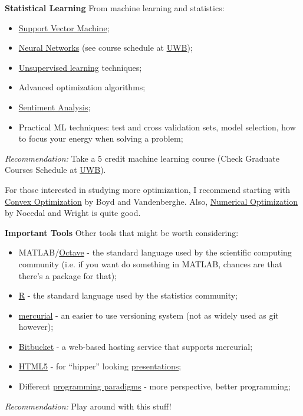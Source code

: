 \documentclass[xcolor=dvipsnames]{beamer}
\begin{document}
\begin{frame}
{\bf Statistical Learning}
From machine learning and statistics: \pause
\begin{itemize}
\item \href{https://en.wikipedia.org/wiki/Support_vector_machine}{Support Vector Machine};\pause
\item \href{https://en.wikipedia.org/wiki/Neural_network}{Neural Networks} (see course schedule at \href{http://www.washington.edu/students/crscatb/css.html\#css485}{UWB});\pause
\item \href{https://en.wikipedia.org/wiki/Unsupervised_learning}{Unsupervised learning} techniques;\pause
\item Advanced optimization algorithms;\pause
\item \href{https://en.wikipedia.org/wiki/Sentiment_analysis}{Sentiment Analysis};\pause
\item Practical ML techniques: test and cross validation sets, model selection, how to focus your energy when solving a problem;
\end{itemize}

\emph{Recommendation: }Take a 5 credit machine learning course (Check Graduate Courses Schedule at \href{http://www.washington.edu/students/crscatb/css.html\#css581}{UWB}). \pause \vfill

For those interested in studying more optimization, I recommend starting with \href{http://www.stanford.edu/~boyd/cvxbook/}{Convex Optimization} by Boyd and Vandenberghe. Also, \href{http://www.ece.northwestern.edu/~nocedal/book/num-opt.html}{Numerical Optimization} by Nocedal and Wright is quite good.
\end{frame}

\begin{frame}
{\bf Important Tools}
Other tools that might be worth considering: \pause
\begin{itemize}
\item MATLAB/\href{https://gnu.org/software/octave/}{Octave} - the standard language used by the scientific computing community (i.e. if you want do something in MATLAB, chances are that there's a package for that);\pause
\item \href{http://www.r-project.org/}{R} - the standard language used by the statistics community;\pause
\item \href{http://mercurial.selenic.com/}{mercurial} - an easier to use versioning system (not as widely used as git however);\pause
\item \href{https://bitbucket.org/}{Bitbucket} - a web-based hosting service that supports mercurial;\pause
\item \href{http://www.html5rocks.com/en/features/presentation}{HTML5} - for ``hipper'' looking \href{http://slides.html5rocks.com}{presentations};\pause
\item Different \href{https://en.wikipedia.org/wiki/Programming_paradigm}{programming paradigms} - more perspective, better programming;
\end{itemize}
\emph{Recommendation: } Play around with this stuff!
\end{frame}
\end{document}
